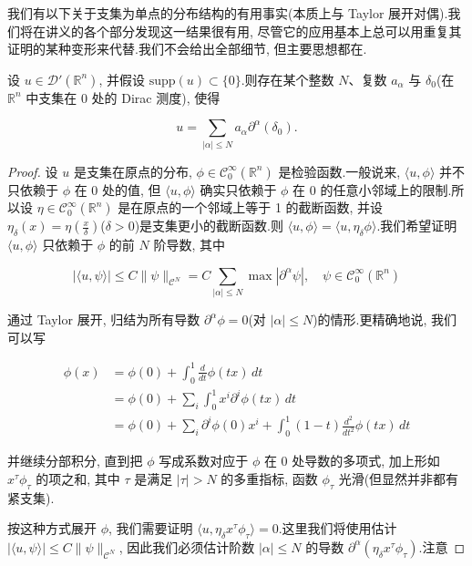 我们有以下关于支集为单点的分布结构的有用事实(本质上与 Taylor 展开对偶).我们将在讲义的各个部分发现这一结果很有用, 尽管它的应用基本上总可以用重复其证明的某种变形来代替.我们不会给出全部细节, 但主要思想都在.

\begin{proposition}\label{prop:c3-3.9}
设 $u\in\mathcal{D}'(\mathbb{R}^n)$, 并假设 $\mathrm{supp}(u)\subset\{0\}$.则存在某个整数 $N$、复数 $a_{\alpha}$ 与 $\delta_0$(在 $\mathbb{R}^n$ 中支集在 0 处的 Dirac 测度), 使得

\[
u = \sum_{|\alpha|\leq N}a_{\alpha}\partial^{\alpha}(\delta_0).
\]
\end{proposition}

\begin{proof}
设 $u$ 是支集在原点的分布, $\phi\in\mathcal{C}_0^{\infty}(\mathbb{R}^n)$ 是检验函数.一般说来, $\langle u, \phi\rangle$ 并不只依赖于 $\phi$ 在 0 处的值, 但 $\langle u, \phi\rangle$ 确实只依赖于 $\phi$ 在 0 的任意小邻域上的限制.所以设 $\eta\in\mathcal{C}_0^{\infty}(\mathbb{R}^n)$ 是在原点的一个邻域上等于 1 的截断函数, 并设 $\eta_{\delta}(x) = \eta(\frac{x}{\delta})$($\delta>0$)是支集更小的截断函数.则 $\langle u, \phi\rangle = \langle u, \eta_{\delta}\phi\rangle$.我们希望证明 $\langle u, \phi\rangle$ 只依赖于 $\phi$ 的前 $N$ 阶导数, 其中

\[
|\langle u, \psi\rangle|\leq C\|\psi\|_{\mathcal{C}^N} = C\sum_{|\alpha|\leq N}\max|\partial^{\alpha}\psi|, \quad \psi\in\mathcal{C}_0^{\infty}(\mathbb{R}^n)
\]

通过 Taylor 展开, 归结为所有导数 $\partial^{\alpha}\phi = 0$(对 $|\alpha|\leq N$)的情形.更精确地说, 我们可以写

\[
\begin{aligned}
\phi(x) &= \phi(0) + \int_0^1\frac{d}{dt}\phi(tx)\, dt \\
&= \phi(0) + \sum_i\int_0^1x^i\partial^i\phi(tx)\, dt \\
&= \phi(0) + \sum_i\partial^i\phi(0)x^i + \int_0^1(1-t)\frac{d^2}{dt^2}\phi(tx)\, dt
\end{aligned}
\]

并继续分部积分, 直到把 $\phi$ 写成系数对应于 $\phi$ 在 0 处导数的多项式, 加上形如 $x^{\tau}\phi_{\tau}$ 的项之和, 其中 $\tau$ 是满足 $|\tau|>N$ 的多重指标, 函数 $\phi_{\tau}$ 光滑(但显然并非都有紧支集).

按这种方式展开 $\phi$, 我们需要证明 $\langle u, \eta_{\delta}x^{\tau}\phi_{\tau}\rangle = 0$.这里我们将使用估计 $|\langle u, \psi\rangle|\leq C\|\psi\|_{\mathcal{C}^N}$, 因此我们必须估计阶数 $|\alpha|\leq N$ 的导数 $\partial^{\alpha}(\eta_{\delta}x^{\tau}\phi_{\tau})$.注意


\end{proof}
